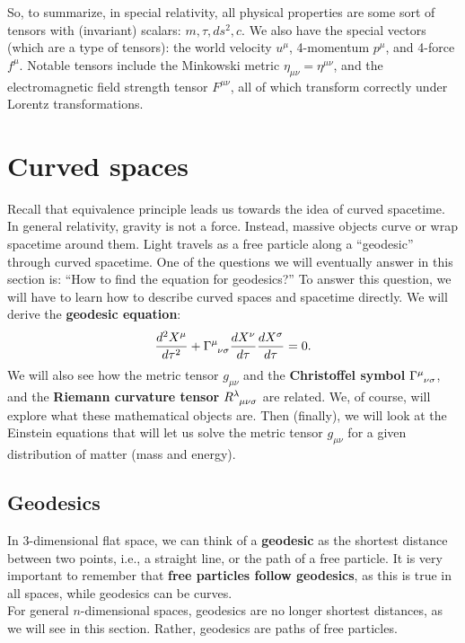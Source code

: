 \documentclass{article}
\theoremstyle{definition}
\begin{document}
So, to summarize, in special relativity, all physical properties are some sort of tensors with (invariant) scalars: $m, \tau, ds^2, c $. We also have the special vectors (which are a type of tensors): the world velocity $u^\mu$, 4-momentum $p^\mu$, and 4-force $f^\mu$. Notable tensors include the Minkowski metric $\eta_{\mu\nu} = \eta^{\mu\nu}$, and the electromagnetic field strength tensor $F^{\mu\nu}$, all of which transform correctly under Lorentz transformations.

\newpage

\section{Curved spaces}
Recall that equivalence principle leads us towards the idea of curved spacetime. In general relativity, gravity is not a force. Instead, massive objects curve or wrap spacetime around them. Light travels as a free particle along a ``geodesic'' through curved spacetime. One of the questions we will eventually answer in this section is: ``How to find the equation for geodesics?'' To answer this question, we will have to learn how to describe curved spaces and spacetime directly. We will derive the \textbf{geodesic equation}:
\begin{align*}
\frac{d^2X^\mu}{d\tau^2} + \tensor{\Gamma}{^\mu_{\nu\sigma}}\frac{dX^\nu}{d\tau}\frac{dX^\sigma}{d\tau} = 0.
\end{align*}
We will also see how the metric tensor $g_{\mu\nu}$ and the \textbf{Christoffel symbol} $\tensor{\Gamma}{^\mu_{\nu\sigma}}$, and the \textbf{Riemann curvature tensor} $\tensor{R}{^\lambda_{\mu\nu\sigma}}$ are related. We, of course, will explore what these mathematical objects are. Then (finally), we will look at the Einstein equations that will let us solve the metric tensor $g_{\mu\nu}$ for a given distribution of matter (mass and energy). 
\subsection{Geodesics}
In 3-dimensional flat space, we can think of a \textbf{geodesic} as the shortest distance between two points, i.e., a straight line, or the path of a free particle. It is very important to remember that \textbf{free particles follow geodesics}, as this is true in all spaces, while geodesics can be curves.\\

For general $n$-dimensional spaces, geodesics are no longer shortest distances, as we will see in this section. Rather, geodesics are paths of free particles. \\
\end{document}
